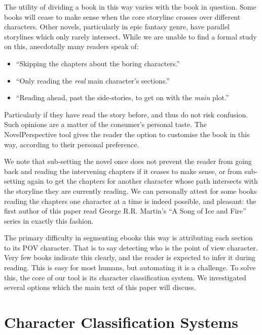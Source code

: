 \documentclass[]{book}
\begin{document}
The utility of dividing a book in this way varies with the book in question.
Some books will cease to make sense when the core storyline crosses over different characters.
Other novels, particularly in epic fantasy genre,
have parallel storylines which only rarely intersect.
While we are unable to find a formal study on this, 
anecdotally many readers speak of:
\begin{itemize}
	\item ``Skipping the chapters about the boring characters.''
	\item ``Only reading the \emph{real} main character's sections.''
	\item ``Reading ahead, past the side-stories, to get on with the \emph{main} plot.''	
\end{itemize}
Particularly if they have read the story before, and thus do not risk confusion.
Such opinions are a matter of the consumer's personal taste.
The NovelPerspective tool gives the reader the option to customise the book in this way, according to their personal preference.

We note that sub-setting the novel once does not prevent the reader from going back and reading the intervening chapters if it ceases to make sense, or from sub-setting again to get the chapters for another character whose path intersects with the storyline they are currently reading.
We can personally attest for some books reading the chapters one character at a time is indeed possible, and pleasant: the first author of this paper read George R.R. Martin's ``A Song of Ice and Fire'' series in exactly this fashion.


The primary difficulty in segmenting ebooks this way is attributing each section to its POV character.
That is to say detecting who is the point of view character.
Very few books indicate this clearly, and the reader is expected to infer it during reading.
This is easy for most humans, but automating it is a challenge.
To solve this, the core of our tool is its character classification system.
We investigated several options which the main text of this paper will discuss.


\section{Character Classification Systems}
\end{document}
